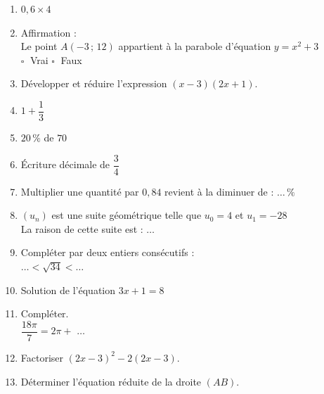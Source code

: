 \documentclass[a4paper,11pt,landscape,exos]{nsi} %
\begin{document}
\begin{multicols}{2}
\maketitle

\begin{enumerate}[itemsep=1em]
	\item $0{,}6\times4$
	\item Affirmation : \\
    Le point $A(-3\,;\,12)$ appartient à la parabole d'équation $y=x^2+3$ \\	$\square\;$ Vrai \qquad $\square\;$ Faux\qquad 
	\item Développer et réduire l'expression $(x-3)(2x+1)$.\\
	\item $1+\dfrac{1}{3}$ 
	\item $20\,\%$ de $70$
	\item Écriture décimale de   $\dfrac{3}{4}$ \\
	\item Multiplier une quantité par $0{,}84$ revient à la diminuer de : $\ldots\,\%$
	\item $(u_n)$ est une suite géométrique telle que $u_0=4$ et $u_1=-28$\\La raison de cette suite est :  $\ldots$
	\item Compléter par deux entiers consécutifs : \\$\ldots < \sqrt{34} < \ldots$
	\item Solution de l'équation $3x+1=8$\\
	\item Compléter.\\
      $\dfrac{18\pi}{7}=2\pi+$  $\ldots$
	\item  Factoriser   $(2x-3)^2-2(2x-3)$.\\
	\item Déterminer l'équation réduite de la droite $(AB)$.\\    \begin{tikzpicture}[baseline,scale = 0.6]


\end{tikzpicture}
\end{enumerate}
\end{multicols}
\end{document}
